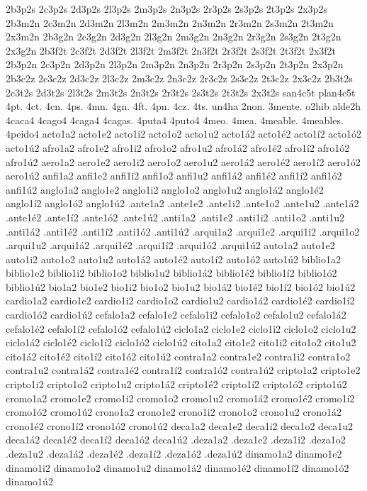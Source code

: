 {2b3p2s 2c3p2s 2d3p2s 2l3p2s 2m3p2s 2n3p2s 2r3p2s 2s3p2s 2t3p2s 2x3p2s 
2b3m2n 2c3m2n 2d3m2n 2l3m2n 2m3m2n 2n3m2n 2r3m2n 2s3m2n 2t3m2n 2x3m2n 
2b3g2n 2c3g2n 2d3g2n 2l3g2n 2m3g2n 2n3g2n 2r3g2n 2s3g2n 2t3g2n 2x3g2n 
2b3f2t 2c3f2t 2d3f2t 2l3f2t 2m3f2t 2n3f2t 2r3f2t 2s3f2t 2t3f2t 2x3f2t 
2b3p2n 2c3p2n 2d3p2n 2l3p2n 2m3p2n 2n3p2n 2r3p2n 2s3p2n 2t3p2n 2x3p2n 
2b3c2z 2c3c2z 2d3c2z 2l3c2z 2m3c2z 2n3c2z 2r3c2z 2s3c2z 2t3c2z 2x3c2z 
2b3t2s 2c3t2s 2d3t2s 2l3t2s 2m3t2s 2n3t2s 2r3t2s 2s3t2s 2t3t2s 2x3t2s 
san4c5t plan4c5t 
%
4pt. 4ct. 4cn. 4ps. 4mn. 4gn. 4ft. 4pn. 4cz. 4ts. 
un4ha 2non. 3mente. o2hib alde2h 
%
4caca4 4cago4 4caga4 4cagas. 4puta4 4puto4 4meo. 4mea. 
4meable. 4meables. 4peido4 
%
acto1a2 acto1e2 acto1i2 acto1o2 acto1u2 acto1á2 acto1é2 acto1í2 acto1ó2 acto1ú2 
afro1a2 afro1e2 afro1i2 afro1o2 afro1u2 afro1á2 afro1é2 afro1í2 afro1ó2 afro1ú2 
aero1a2 aero1e2 aero1i2 aero1o2 aero1u2 aero1á2 aero1é2 aero1í2 aero1ó2 aero1ú2 
anfi1a2 anfi1e2 anfi1i2 anfi1o2 anfi1u2 anfi1á2 anfi1é2 anfi1í2 anfi1ó2 anfi1ú2 
anglo1a2 anglo1e2 anglo1i2 anglo1o2 anglo1u2 anglo1á2 anglo1é2 anglo1í2 anglo1ó2 anglo1ú2 
.ante1a2 .ante1e2 .ante1i2 .ante1o2 .ante1u2 .ante1á2 .ante1é2 .ante1í2 .ante1ó2 .ante1ú2 
.anti1a2 .anti1e2 .anti1i2 .anti1o2 .anti1u2 .anti1á2 .anti1é2 .anti1í2 .anti1ó2 .anti1ú2 
.arqui1a2 .arqui1e2 .arqui1i2 .arqui1o2 .arqui1u2 .arqui1á2 .arqui1é2 .arqui1í2 .arqui1ó2 .arqui1ú2 
auto1a2 auto1e2 auto1i2 auto1o2 auto1u2 auto1á2 auto1é2 auto1í2 auto1ó2 auto1ú2 
biblio1a2 biblio1e2 biblio1i2 biblio1o2 biblio1u2 biblio1á2 biblio1é2 biblio1í2 biblio1ó2 biblio1ú2 
bio1a2 bio1e2 bio1i2 bio1o2 bio1u2 bio1á2 bio1é2 bio1í2 bio1ó2 bio1ú2 
cardio1a2 cardio1e2 cardio1i2 cardio1o2 cardio1u2 cardio1á2 cardio1é2 cardio1í2 cardio1ó2 cardio1ú2 
cefalo1a2 cefalo1e2 cefalo1i2 cefalo1o2 cefalo1u2 cefalo1á2 cefalo1é2 cefalo1í2 cefalo1ó2 cefalo1ú2 
ciclo1a2 ciclo1e2 ciclo1i2 ciclo1o2 ciclo1u2 ciclo1á2 ciclo1é2 ciclo1í2 ciclo1ó2 ciclo1ú2 
cito1a2 cito1e2 cito1i2 cito1o2 cito1u2 cito1á2 cito1é2 cito1í2 cito1ó2 cito1ú2 
contra1a2 contra1e2 contra1i2 contra1o2 contra1u2 contra1á2 contra1é2 contra1í2 contra1ó2 contra1ú2 
cripto1a2 cripto1e2 cripto1i2 cripto1o2 cripto1u2 cripto1á2 cripto1é2 cripto1í2 cripto1ó2 cripto1ú2 
cromo1a2 cromo1e2 cromo1i2 cromo1o2 cromo1u2 cromo1á2 cromo1é2 cromo1í2 cromo1ó2 cromo1ú2 
crono1a2 crono1e2 crono1i2 crono1o2 crono1u2 crono1á2 crono1é2 crono1í2 crono1ó2 crono1ú2 
deca1a2 deca1e2 deca1i2 deca1o2 deca1u2 deca1á2 deca1é2 deca1í2 deca1ó2 deca1ú2 
.deza1a2 .deza1e2 .deza1i2 .deza1o2 .deza1u2 .deza1á2 .deza1é2 .deza1í2 .deza1ó2 .deza1ú2 
dinamo1a2 dinamo1e2 dinamo1i2 dinamo1o2 dinamo1u2 dinamo1á2 dinamo1é2 dinamo1í2 dinamo1ó2 dinamo1ú2 
}
